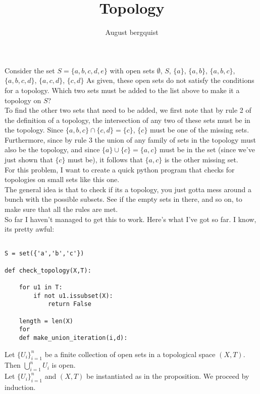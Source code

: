 \documentclass{article}
\title{Topology}
\author{August bergquist}
\theoremstyle{definition}
\begin{document}
\maketitle
\large
{}
Consider the set $S = \{a, b, c, d, e\}$ with open sets $\emptyset$, $S$, $\{a\}$, $\{a, b\}$, $\{a, b, c\}$,
$\{a, b, c, d\}$, $\{a, c, d\}$, $\{c, d\}$
As given, these open sets do not satisfy the conditions for a topology. Which
two sets must be added to the list above to make it a topology on $S$?\\

 To find the other two sets that need to be added, we first note that by rule 2 of the definition of a topology, the intersection of any two of these sets must be in the topology. Since $\{a,b,c\}\cap \{c,d\} = \{c\}$, $\{c\}$ must be one of the missing sets. Furthermore, since by rule 3 the union of any family of sets in the topology must also be the topology, and since $\{a\}\cup \{c\} = \{a,c\}$ must be in the set (since we've just shown that $\{c\}$ must be), it follows that $\{a,c\}$ is the other missing set.\\


 For this problem, I want to create a quick python program that checks for topologies on small sets like this one.\\

The general idea is that to check if its a topology, you just gotta mess around a bunch with the possible subsets. See if the empty sets in there, and so on, to make sure that all the rules are met. \\

So far I haven't managed to get this to work. Here's what I've got so far. I know, its pretty awful:
\begin{lstlisting}

S = set({'a','b','c'})

def check_topology(X,T):

    for u1 in T:
        if not u1.issubset(X):
            return False

    length = len(X)
    for 
    def make_union_iteration(i,d):

\end{lstlisting}

 Let $\{U_i\}^n_{i = 1}$ be a finite collection of open sets in a topological space $(X,T)$. Then $\bigcup^n_{i = 1}U_i$ is open.\\

 Let $\{U_i\}^n_{i = 1}$ and $(X,T)$ be instantiated as in the proposition. We proceed by induction.\\
\end{document}

